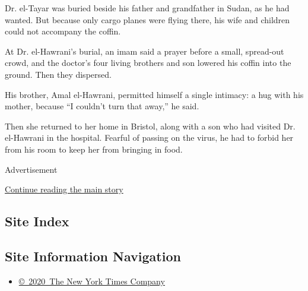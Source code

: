 Dr. el-Tayar was buried beside his father and grandfather in Sudan, as
he had wanted. But because only cargo planes were flying there, his wife
and children could not accompany the coffin.

At Dr. el-Hawrani's burial, an imam said a prayer before a small,
spread-out crowd, and the doctor's four living brothers and son lowered
his coffin into the ground. Then they dispersed.

His brother, Amal el-Hawrani, permitted himself a single intimacy: a hug
with his mother, because ``I couldn't turn that away,'' he said.

Then she returned to her home in Bristol, along with a son who had
visited Dr. el-Hawrani in the hospital. Fearful of passing on the virus,
he had to forbid her from his room to keep her from bringing in food.

Advertisement

\protect\hyperlink{after-bottom}{Continue reading the main story}

\hypertarget{site-index}{%
\subsection{Site Index}\label{site-index}}

\hypertarget{site-information-navigation}{%
\subsection{Site Information
Navigation}\label{site-information-navigation}}

\begin{itemize}
\tightlist
\item
  \href{https://help.nytimes3xbfgragh.onion/hc/en-us/articles/115014792127-Copyright-notice}{©~2020~The
  New York Times Company}
\end{itemize}

